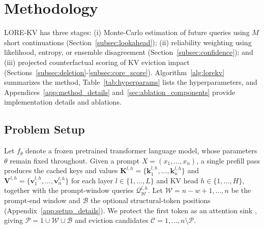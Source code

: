 \documentclass{article} %
\begin{document}
\section{Methodology} \label{sec:methodology}
LORE-KV has three stages: (i) Monte-Carlo estimation of future queries using $M$ short continuations (Section~\ref{subsec:lookahead}); (ii) reliability weighting using likelihood, entropy, or ensemble disagreement (Section~\ref{subsec:confidence}); and (iii) projected counterfactual scoring of KV eviction impact (Sections~\ref{subsec:deletion}-\ref{subsec:core_score}). Algorithm~\ref{alg:lorekv} summarizes the method, Table~\ref{tab:hyperparams} lists the hyperparameters, and Appendices~\ref{app:method_details} and~\ref{sec:ablation_components} provide implementation details and ablations.

\subsection{Problem Setup} \label{subsec:problem_setup}
Let $f_\theta$ denote a frozen pretrained transformer language model, whose parameters $\theta$ remain fixed throughout. Given a prompt $X=(x_1,\ldots,x_n)$, a single prefill pass produces the cached keys and values $\mathbf{K}^{l,h}=\{\mathbf{k}^{l,h}_{1},\ldots,\mathbf{k}^{l,h}_{n}\}$ and $\mathbf{V}^{l,h}=\{\mathbf{v}^{l,h}_{1},\ldots,\mathbf{v}^{l,h}_{n}\}$ for each layer $l\in\{1,\ldots,L\}$ and KV head $h\in\{1,\ldots,H\}$, together with the prompt-window queries $\mathcal{Q}^{l,h}_{\mathcal{W}}$. Let $\mathcal{W}={n-w+1,\ldots,n}$ be the prompt-end window and $\mathcal{B}$ the optional structural-token positions (Appendix~\ref{app:setup_details}). We protect the first token as an attention sink \citep{xiao2023streamingllm}, giving $\mathcal{P}={1}\cup\mathcal{W}\cup\mathcal{B}$ and eviction candidates $\mathcal{C}={1,\ldots,n}\setminus\mathcal{P}$.
\end{document}
